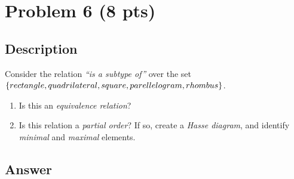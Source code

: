 \newpage

\section{Problem 6 (8 pts)}
\subsection{Description}

\noindent Consider the relation \textit{``is a subtype of''} over the set $\{ rectangle, quadrilateral, square, parellelogram,\\rhombus\}$.

\begin{enumerate}

\item Is this an \textit{equivalence relation}?

\item Is this relation a \textit{partial order}? If so, create a \textit{Hasse diagram}, and identify \textit{minimal} and \textit{maximal} elements.

\end{enumerate}

\subsection{Answer}

